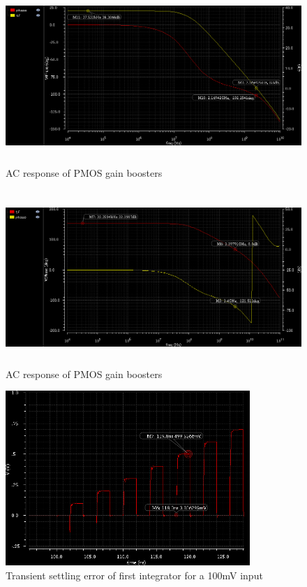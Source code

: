 \documentclass[conference]{IEEEtran}
\begin{document}
\begin{figure}[H]
\centering
\includegraphics[height=250px]{piktures/gbp_ac}
\caption{AC response of PMOS gain boosters}
\label{fig:gbp_ac}
\end{figure}

\begin{figure}[H]
\centering
\includegraphics[height=250px]{piktures/gbn_ac}
\caption{AC response of PMOS gain boosters}
\label{fig:gbn_ac}
\end{figure}




\begin{figure}[H]
\centering
\includegraphics[height=250px]{piktures/st1_error}
\caption{Transient settling error of first integrator for a 100mV input}
\label{fig:st1_error}
\end{figure}
\end{document}
